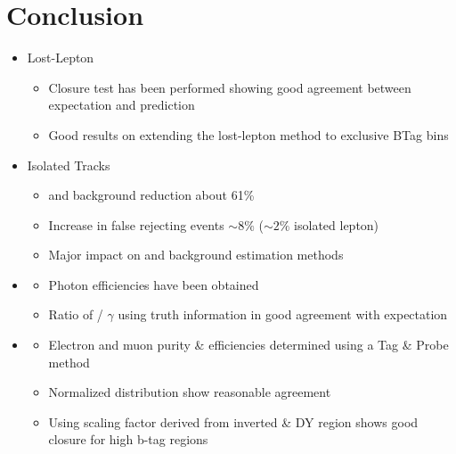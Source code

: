 \documentclass{beamer}
\begin{document}
\section{Conclusion}
\begin{frame}

\begin{itemize}
 \item Lost-Lepton
 \begin{itemize}
  \item Closure test has been performed showing good agreement between expectation and prediction
  \item Good results on extending the lost-lepton method to exclusive BTag bins
 \end{itemize}
 \item Isolated Tracks
 \begin{itemize}
  \item \ttbar and \wpj background reduction about 61\%
  \item Increase in false rejecting events $\sim8\%$ ($\sim2\%$ isolated lepton)
  \item Major impact on \ttbar and \wpj background estimation methods
 \end{itemize}
  \item \photonJets
 \begin{itemize}
  \item Photon efficiencies have been obtained
  \item Ratio of \ZInv / $\gamma$ using truth information in good agreement with expectation
 \end{itemize}
 \item \Zll
 \begin{itemize}
  \item Electron and muon purity \& efficiencies determined using a Tag \& Probe method
  \item Normalized \met distribution show reasonable agreement
  \item Using scaling factor derived from inverted \met\& \HT DY region shows good closure for high b-tag regions
 \end{itemize}

 
\end{itemize}


\end{frame}
\end{document}

